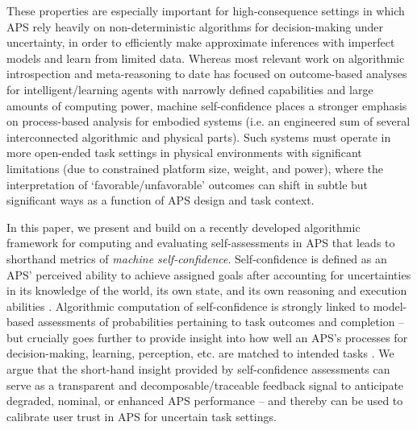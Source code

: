 These properties are especially important for high-consequence settings in which APS rely heavily on non-deterministic algorithms for decision-making under uncertainty, in order to efficiently make approximate inferences with imperfect models and learn from limited data. 
Whereas most relevant work on algorithmic introspection and meta-reasoning to date has focused on outcome-based analyses for intelligent/learning agents with narrowly defined capabilities and large amounts of computing power, machine self-confidence places a stronger emphasis on process-based analysis for embodied systems (i.e. an engineered sum of several interconnected algorithmic and physical parts). Such systems must operate in more open-ended task settings in physical environments with significant limitations (due to constrained platform size, weight, and power), where the interpretation of `favorable/unfavorable' outcomes can shift in subtle but significant ways as a function of APS design and task context. 

In this paper, we present and build on a recently developed algorithmic framework for computing and evaluating self-assessments in APS that leads to shorthand metrics of \emph{machine self-confidence}. Self-confidence is defined as an APS' perceived ability to achieve assigned goals after accounting for uncertainties in its knowledge of the world, its own state, and its own reasoning and execution abilities \cite{Aitken2016-cv, Aitken2016-fb, Sweet2016-tz}. 
Algorithmic computation of self-confidence is strongly linked to model-based assessments of probabilities pertaining to task outcomes and completion -- but crucially goes further to provide insight into how well an APS's processes for decision-making, learning, perception, etc. are matched to intended tasks \cite{Hutchins2015-if}. 
We argue that the short-hand insight provided by self-confidence assessments can serve as a transparent and decomposable/traceable feedback signal to anticipate degraded, nominal, or enhanced APS performance -- %
and thereby can be used to calibrate user trust in APS for uncertain task settings. 

